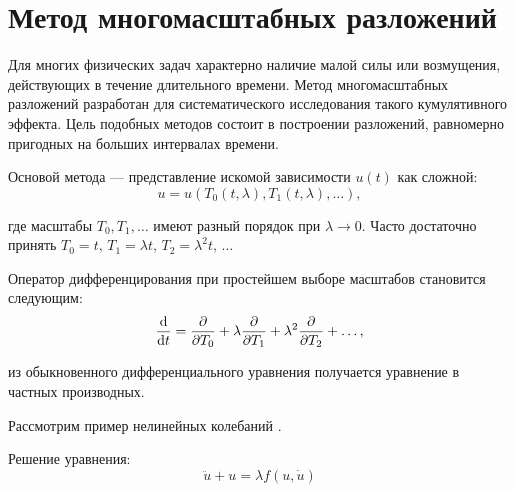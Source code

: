 \chapter*{Метод многомасштабных разложений}

Для многих физических задач характерно
наличие малой силы или возмущения,
действующих в течение длительного времени.
Метод многомасштабных разложений разработан
для систематического исследования
такого кумулятивного эффекта.
Цель подобных методов состоит
в построении разложений,
равномерно пригодных на больших интервалах времени.
\cite{coul1972}

Основой метода --- представление
искомой зависимости $u(t)$ как сложной:
\begin{equation*}
    u = u(T_0(t, \lambda), T_1(t, \lambda), \dots),
\end{equation*}

где масштабы $T_0, T_1, \dots$
имеют разный порядок при $\lambda \to 0$.
Часто достаточно принять
$T_0 = t, \, T_1 = \lambda t, \, T_2 = \lambda^2 t, \, \dots$

Оператор дифференцирования при простейшем выборе масштабов
становится следующим:
\begin{equation*}
    \dv{}{t} = \pdv{}{T_0} + \lambda \pdv{}{T_1} +
    \lambda^2 \pdv{}{T_2} + \dots,
\end{equation*}

из обыкновенного дифференциального уравнения
получается уравнение в частных производных.

Рассмотрим пример нелинейных колебаний \cite{eliseev1999}.

Решение уравнения:
\begin{equation*}
    \ddot{u} + u = \lambda f(u, \dot{u})
\end{equation*}



